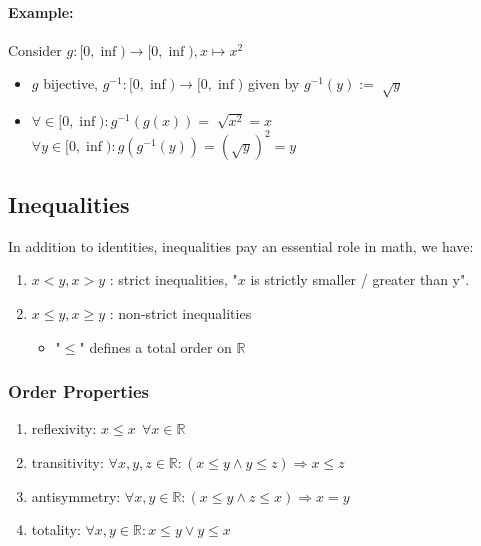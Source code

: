 \documentclass[twocolumn]{article}
\begin{document}
			\paragraph{Example:}
				Consider $g:[0,\inf)\to[0,\inf),x\mapsto x^2$
				\begin{itemize}
				\item $g$ bijective, $g^{-1}:[0,\inf)\to[0,\inf)$ given by $g^{-1}(y):=\sqrt[]{y}$
				\item $\forall \in[0,\inf):g^{-1}(g(x))=\sqrt[]{x^2}=x$
				\\ $\forall y\in[0,\inf):g(g^{-1}(y))=(\sqrt y)^2=y$ 
				\end{itemize}

	\subsection{Inequalities}
		In addition to identities, inequalities pay an essential role in math, we have:
		\begin{enumerate}
		\item $x<y,x>y$ : strict inequalities, "$x$ is strictly smaller / greater than y".
		\item $x\le y,x\ge y$ : non-strict inequalities
		\begin{itemize}%
		\renewcommand{\labelitemi}{$\Rightarrow$}
		\item "$\le$" defines a total order on $\mathbb R $  
		\end{itemize}
		\end{enumerate}

		\subsubsection{Order Properties}
			\begin{enumerate}
			\item reflexivity: $x\le x~~\forall x\in\mathbb R $
			\item transitivity: $\forall x,y,z\in\mathbb R :(x\le y\wedge y\le z)\Rightarrow x\le z$
			\item antisymmetry: $\forall x,y\in\mathbb R :(x\le y\wedge z\le x)\Rightarrow x=y$
			\item totality: $\forall x,y\in\mathbb R :x\le y\vee y\le x$ 
			\end{enumerate}
\end{document}
